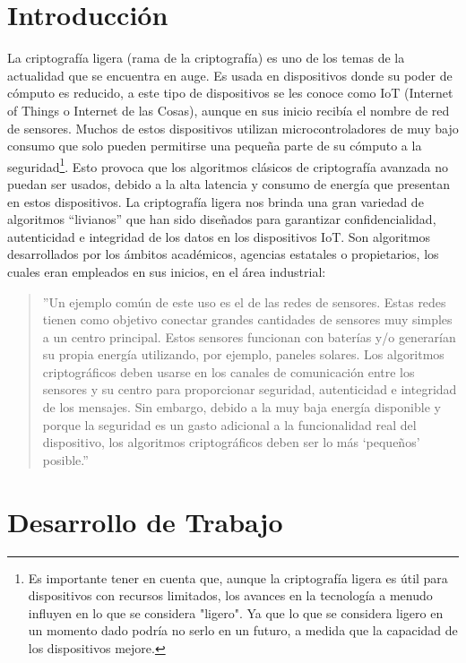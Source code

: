 \documentclass[a4paper,10pt]{article}
\begin{document}
	\section{Introducción}
La criptografía ligera (rama de la criptografía) es uno de los temas de la actualidad que se encuentra en auge. Es usada en dispositivos donde su poder de cómputo es reducido, a este tipo de dispositivos se les conoce como IoT (Internet of Things o Internet de las Cosas), aunque en sus inicio recibía el nombre de red de sensores. Muchos de estos dispositivos utilizan microcontroladores de muy bajo consumo que solo pueden permitirse una pequeña parte de su cómputo a la seguridad\footnote{Es importante tener en cuenta que, aunque la criptografía ligera es útil para dispositivos con recursos limitados, los avances en la tecnología a menudo influyen en lo que se considera "ligero". Ya que lo que se considera ligero en un momento dado podría no serlo en un futuro, a medida que la capacidad de los dispositivos mejore.}. Esto provoca que los algoritmos clásicos de criptografía avanzada no puedan ser usados, debido a la alta latencia y consumo de energía que presentan en estos dispositivos. La criptografía ligera nos brinda una gran variedad de algoritmos “livianos” que han sido diseñados para garantizar confidencialidad, autenticidad e integridad de los datos en los dispositivos IoT. Son algoritmos desarrollados por los ámbitos académicos, agencias estatales o propietarios, los cuales eran empleados en sus inicios, en el área industrial:
	\begin{quote}
		''Un ejemplo común de este uso es el de las redes de sensores. Estas redes tienen como objetivo conectar grandes cantidades de sensores muy simples a un centro principal. Estos sensores funcionan con baterías y/o generarían su propia energía utilizando, por ejemplo, paneles solares. Los algoritmos criptográficos deben usarse en los canales de comunicación entre los sensores y su centro para proporcionar seguridad, autenticidad e integridad de los mensajes. Sin embargo, debido a la muy baja energía disponible y porque la seguridad es un gasto adicional a la funcionalidad real del dispositivo, los algoritmos criptográficos deben ser lo más ‘pequeños’ posible.'' \parencite[1]{biryukov2017state}
	\end{quote}
	\section{Desarrollo de Trabajo}
	
\end{document}

